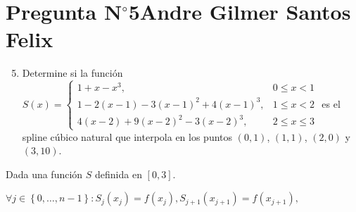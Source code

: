 \section{Pregunta N$^{\circ}$5\qquad Andre Gilmer Santos Felix}

\begin{frame}
    \begin{enumerate}\setcounter{enumi}{4}
        \item


              Determine si la función
              \begin{math}
                  S\left(x\right)=
                  \begin{cases}
                      1+
                      x-
                      x^{3},                   & 0 \leq x<1      \\
                      1-
                      2\left(x-1\right)-
                      3{\left(x-1\right)}^{2}+
                      4{\left(x-1\right)}^{3}, & 1 \leq x<2      \\
                      4\left(x-2\right)+
                      9{\left(x-2\right)}^{2}-
                      3{\left(x-2\right)}^{3}, & 2 \leq x \leq 3
                  \end{cases}
              \end{math}
              es el \alert{spline cúbico natural} que interpola en
              los puntos $\left(0,1\right)$, $\left(1,1\right)$,
              $\left(2,0\right)$ y $\left(3,10\right)$.
    \end{enumerate}

    \begin{solution}
        Dada una función $S$ definida en
        \begin{math}
            \left[
                0,3
                \right]
        \end{math}.

        \begin{math}
            \forall j\in\left\{0,\dotsc,n-1\right\}:
            S_{j}\left(x_{j}\right)=
            f\left(x_{j}\right),
            S_{j+1}\left(x_{j+1}\right)=
            f\left(x_{j+1}\right),
        \end{math}
    \end{solution}
\end{frame}

